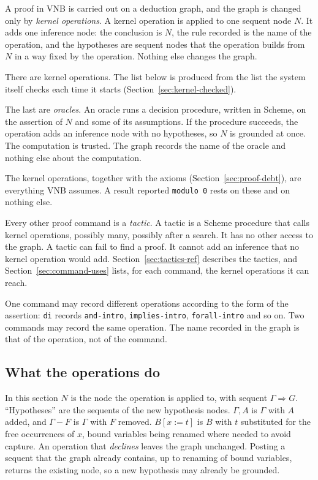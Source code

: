 A proof in VNB is carried out on a deduction graph, and the graph is
changed only by \emph{kernel operations}.  A kernel operation is applied
to one sequent node $N$.  It adds one inference node: the conclusion is
$N$, the rule recorded is the name of the operation, and the hypotheses
are sequent nodes that the operation builds from $N$ in a way fixed by
the operation.  Nothing else changes the graph.

There are \VNBkernelopcount{} kernel operations.  The list below is
produced from the list the system itself checks each time it starts
(Section~\ref{sec:kernel-checked}).

\VNBkerneloptable

The last \VNBkernelopcountoracle{} are \emph{oracles}.  An oracle runs a
decision procedure, written in Scheme, on the assertion of $N$ and some
of its assumptions.  If the procedure succeeds, the operation adds an
inference node with no hypotheses, so $N$ is grounded at once.  The
computation is trusted.  The graph records the name of the oracle and
nothing else about the computation.

The kernel operations, together with the axioms
(Section~\ref{sec:proof-debt}), are everything VNB assumes.  A result
reported \texttt{modulo 0} rests on these and on nothing else.

Every other proof command is a \emph{tactic}.  A tactic is a Scheme
procedure that calls kernel operations, possibly many, possibly after a
search.  It has no other access to the graph.  A tactic can fail to find
a proof.  It cannot add an inference that no kernel operation would add.
Section~\ref{sec:tactics-ref} describes the tactics, and
Section~\ref{sec:command-uses} lists, for each command, the kernel
operations it can reach.

\begin{remark}
One command may record different operations according to the form of the
assertion: \texttt{di} records \texttt{and-intro}, \texttt{implies-intro},
\texttt{forall-intro} and so on.  Two commands may record the same
operation.  The name recorded in the graph is that of the operation, not
of the command.
\end{remark}

\subsection{What the operations do}\label{sec:kernel-ops-detail}

In this section $N$ is the node the operation is applied to, with
sequent $\Gamma \Longrightarrow G$.  ``Hypotheses'' are the sequents of
the new hypothesis nodes.  $\Gamma, A$ is $\Gamma$ with $A$ added, and
$\Gamma - F$ is $\Gamma$ with $F$ removed.  $B[x{:=}t]$ is $B$ with $t$
substituted for the free occurrences of $x$, bound variables being
renamed where needed to avoid capture.  An operation that
\emph{declines} leaves the graph unchanged.  Posting a sequent that the
graph already contains, up to renaming of bound variables, returns the
existing node, so a new hypothesis may already be grounded.

